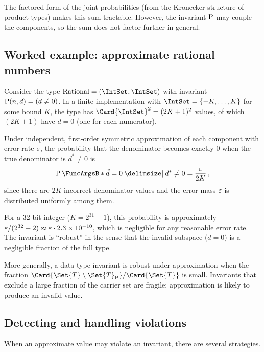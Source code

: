 \documentclass[ ../main.tex]{subfiles}
\begin{document}
The factored form of the joint probabilities (from the Kronecker structure of product types) makes this sum tractable.
However, the invariant $\Fun{P}$ may couple the components, so the sum does not factor further in general.

\subsection{Worked example: approximate rational numbers}
\label{sec:approx_rational}

\begin{example}
Consider the type $\mathrm{Rational} = (\IntSet, \IntSet)$ with invariant $\Fun{P}(n, d) = (d \neq 0)$.
In a finite implementation with $\IntSet = \{-K, \ldots, K\}$ for some bound $K$, the type has $\Card{\IntSet}^2 = (2K + 1)^2$ values, of which $(2K + 1)$ have $d = 0$ (one for each numerator).

Under independent, first-order symmetric approximation of each component with error rate $\varepsilon$, the probability that the denominator becomes exactly $0$ when the true denominator is $d^* \neq 0$ is
\begin{equation}
\Prob{\tilde{d} = 0 \Given d^* \neq 0} = \frac{\fprate}{2K}\,,
\end{equation}
since there are $2K$ incorrect denominator values and the error mass $\varepsilon$ is distributed uniformly among them.

For a 32-bit integer ($K = 2^{31} - 1$), this probability is approximately $\varepsilon / (2^{32} - 2) \approx \varepsilon \cdot 2.3 \times 10^{-10}$, which is negligible for any reasonable error rate.
The invariant is ``robust'' in the sense that the invalid subspace ($d = 0$) is a negligible fraction of the full type.
\end{example}

More generally, a data type invariant is robust under approximation when the fraction $\Card{\Set{T} \setminus \Set{T}_{\Fun{P}}} / \Card{\Set{T}}$ is small.
Invariants that exclude a large fraction of the carrier set are fragile: approximation is likely to produce an invalid value.

\subsection{Detecting and handling violations}

When an approximate value may violate an invariant, there are several strategies.
\end{document}
